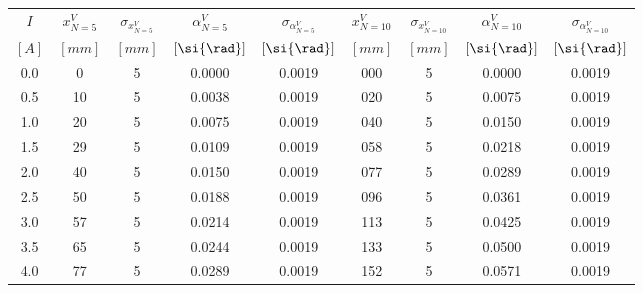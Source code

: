 \begin{tabular}{
    S[table-format=1.1]
    S[table-format=2.0]
    S[table-format=1.0]
    S[table-format=0.4]
    S[table-format=0.4]
    S[table-format=3.0]
    S[table-format=1.0]
    S[table-format=0.4]
    S[table-format=0.4]
} \toprule
{$I$}        & {$x^V_{N=5}$} & {$\sigma_{x^V_{N=5}}$} & {$\alpha^V_{N=5}$} & {$\sigma_{\alpha^V_{N=5}}$} & {$x^V_{N=10}$} & {$\sigma_{x^V_{N=10}}$} & {$\alpha^V_{N=10}$} & {$\sigma_{\alpha^V_{N=10}}$} \\
{$[\si{A}]$} & {$[\si{mm}]$} & {$[\si{mm}]$}          & {$[\si{\rad}]$}    & {$[\si{\rad}]$}             & {$[\si{mm}]$}  & {$[\si{mm}]$}           & {$[\si{\rad}]$}     & {$[\si{\rad}]$}              \\           & 0             & 5                      & 0.0000             & 0.0019                      & 000            & 5                       & 0.0000              & 0.0019                       \\
0.5          & 10            & 5                      & 0.0038             & 0.0019                      & 020            & 5                       & 0.0075              & 0.0019                       \\
1.0          & 20            & 5                      & 0.0075             & 0.0019                      & 040            & 5                       & 0.0150              & 0.0019                       \\
1.5          & 29            & 5                      & 0.0109             & 0.0019                      & 058            & 5                       & 0.0218              & 0.0019                       \\
2.0          & 40            & 5                      & 0.0150             & 0.0019                      & 077            & 5                       & 0.0289              & 0.0019                       \\
2.5          & 50            & 5                      & 0.0188             & 0.0019                      & 096            & 5                       & 0.0361              & 0.0019                       \\
3.0          & 57            & 5                      & 0.0214             & 0.0019                      & 113            & 5                       & 0.0425              & 0.0019                       \\
3.5          & 65            & 5                      & 0.0244             & 0.0019                      & 133            & 5                       & 0.0500              & 0.0019                       \\
4.0          & 77            & 5                      & 0.0289             & 0.0019                      & 152            & 5                       & 0.0571              & 0.0019                       \\ \bottomrule

\end{tabular}